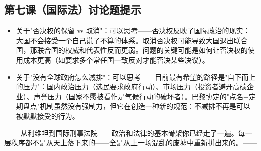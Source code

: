 \documentclass[a4paper,12pt]{ctexart}
\begin{document}
\subsection*{第七课（国际法）讨论题提示}
\begin{itemize}
  \item 关于"否决权的保留 vs 取消"：可以思考——否决权反映了国际政治的现实：大国不会接受一个自己说了不算的体系。取消否决权可能导致大国退出联合国，那联合国的权威和代表性反而更弱。问题的关键可能是如何让否决权的使用成本更高（如要求多个常任国一致反对才能否决某些决议）。
  \item 关于"没有全球政府怎么减排"：可以思考——目前最有希望的路径是"自下而上的压力"：国内政治压力（选民要求政府行动）、市场压力（投资者避开高碳企业）、声誉压力（国家不愿被看作是气候行动的破坏者）。巴黎协定的"点名+定期盘点"机制虽然没有强制力，但它在创造一种新的规范：不减排不再是可以被默默接受的行为。
\end{itemize}

\vspace{0.5cm}
\begin{center}
\textcolor{blue!70!black}{\large —— 从利维坦到国际刑事法院——政治和法律的基本骨架你已经走了一遍。每一层秩序都不是从天上落下来的——全是从上一场混乱的废墟中重新拼出来的。——}
\end{center}
\end{document}
